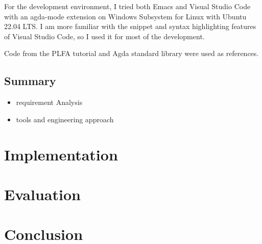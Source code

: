 \documentclass[12pt,twoside,a4paper]{report}
\theoremstyle{definition}
\theoremstyle{definition}
\begin{document}
    For the development environment, I tried both Emacs \cite{emacs} and Visual Studio Code \cite{vscode} with an agda-mode extension \cite{agda_mode} on Windows Subsystem for Linux with Ubuntu \cite{wsl_ubuntu} 22.04 LTS. I am more familiar with the snippet and syntax highlighting features of Visual Studio Code, so I used it for most of the development. 

    Code from the PLFA tutorial and Agda standard library \cite{agda_std} were used as references. 

    \section{Summary}
    \begin{itemize}
        \item 
        requirement Analysis

        \item
        tools and engineering approach

    \end{itemize}

\chapter{Implementation}

\chapter{Evaluation}

\chapter{Conclusion}

    \printbibliography
\end{document}
